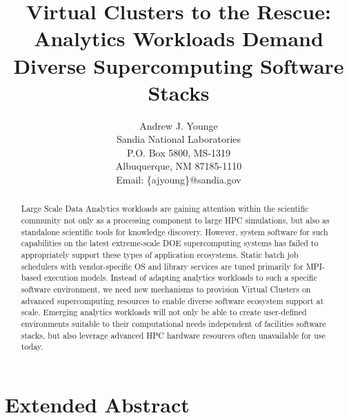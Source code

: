 
\newcommand{\AJY}[1]{{\color{red}\em  AJY: #1}}
\newcommand{\TODO}[1]{{\color{green}\em  TODO: #1}}
\newcommand{\E}[1]{{\color{red}~\blacksquare~\footnote{grammar, spelling, sentence, or other error}~}}

\newcommand{\AUTHOR}{%
Andrew J. Younge\\
Sandia National Laboratories \\
P.O. Box 5800, MS-1319 \\
Albuquerque, NM 87185-1110 \\
Email: \{ajyoung\}@sandia.gov%
}

\newcommand{\TITLE}{Virtual Clusters to the Rescue: Analytics Workloads Demand Diverse Supercomputing Software Stacks}


\title{\TITLE}
\author{\AUTHOR}

\maketitle

\begin{abstract}
Large Scale Data Analytics workloads are gaining attention within the scientific community not only as a processing component to large HPC simulations, but also as standalone scientific tools for knowledge discovery. However, system software for such capabilities on the latest extreme-scale DOE supercomputing systems has failed to appropriately support these types of application ecosystems. Static batch job schedulers with vendor-specific OS and library services are tuned primarily for MPI-based execution models.  Instead of adapting analytics workloads to such a specific software environment, we need new mechanisms to provision Virtual Clusters on advanced supercomputing resources to enable diverse software ecosystem support at scale.  Emerging analytics workloads will not only be able to create user-defined environments suitable to their computational needs independent of facilities software stacks, but also leverage advanced HPC hardware resources often unavailable for use today.

\end{abstract}

\section{Extended Abstract}

